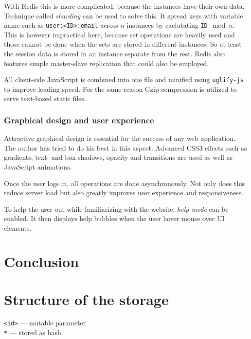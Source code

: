 \documentclass[12pt,oneside]{fithesis}
\begin{document}
		With Redis this is more complicated, because the instances have their own data. Technique called \emph{sharding} can be used to solve this. It spread keys with variable name such as \texttt{user:<ID>:email} across $n$ instances by caclutating \texttt{ID}$\mod{n}$. This is however impractical here, because set operations are heavily used and those cannot be done when the sets are stored in different instances. So at least the session data is stored in an instance separate from the rest. Redis also features simple master-slave replication that could also be employed.
		
		All client-side JavaScript is combined into one file and minified using \texttt{uglify-js} to improve loading speed. For the same reason Gzip compression is utilized to serve text-based static files.
	\subsection{Graphical design and user experience}
		Attractive graphical design is essential for the success of any web application. The author has tried to do his best in this aspect. Advanced CSS3 effects such as gradients, text- and box-shadows, opacity and transitions are used as well as JavaScript animations.
		
		Once the user logs in, all operations are done asynchronously. Not only does this reduce server load but also greatly improves user experience and responsiveness.
		
		To help the user out while familiarizing with the website, \emph{help mode} can be enabled. It then displays help bubbles when the user hover mouse over UI elements.
\chapter{Conclusion}

\appendix
\chapter{Structure of the storage}
\label{appendix:scheme}
\texttt{<id>} --- mutable parameter\\
\texttt{*} --- stored as hash
\inputminted[fontsize=\footnotesize]{yaml}{scheme.txt}


\end{document}
